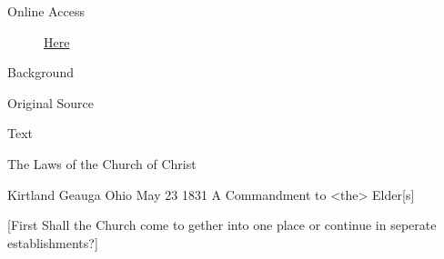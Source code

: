 			\begin{description}
				\item[Online Access] \href{https://www.josephsmithpapers.org/paper-summary/revelation-9-february-1831-dc-421-72/1}{Here}
			\end{description}
			
			\begin{description}
				\item[Background]
			\end{description}
			
			
			\begin{description}
				\item[Original Source]
			\end{description}
			
			
			\begin{description}
				\item[Text]
			\end{description}
			
				\begin{tightcenter}
				The Laws of the Church of Christ
				\end{tightcenter}
				
				Kirtland Geauga Ohio May 23 1831 A Commandment to <the> Elder[s]
				
				[First Shall the Church come to gether into one place or continue in seperate establishments?]
				
